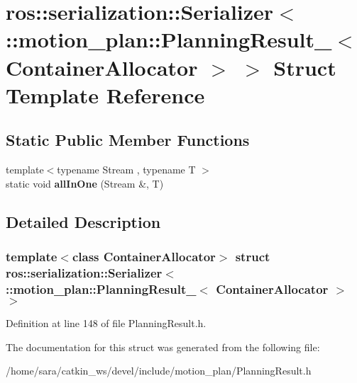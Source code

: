 \hypertarget{structros_1_1serialization_1_1Serializer_3_01_1_1motion__plan_1_1PlanningResult___3_01ContainerAllocator_01_4_01_4}{}\section{ros\+:\+:serialization\+:\+:Serializer$<$ \+:\+:motion\+\_\+plan\+:\+:Planning\+Result\+\_\+$<$ Container\+Allocator $>$ $>$ Struct Template Reference}
\label{structros_1_1serialization_1_1Serializer_3_01_1_1motion__plan_1_1PlanningResult___3_01ContainerAllocator_01_4_01_4}
\subsection*{Static Public Member Functions}
\begin{DoxyCompactItemize}
\item 
\mbox{\label{structros_1_1serialization_1_1Serializer_3_01_1_1motion__plan_1_1PlanningResult___3_01ContainerAllocator_01_4_01_4_aa1f6e021d099a9796adef3cd18d9aa7b}} 
{\footnotesize template$<$typename Stream , typename T $>$ }\\static void {\bfseries all\+In\+One} (Stream \&, T)
\end{DoxyCompactItemize}


\subsection{Detailed Description}
\subsubsection*{template$<$class Container\+Allocator$>$\newline
struct ros\+::serialization\+::\+Serializer$<$ \+::motion\+\_\+plan\+::\+Planning\+Result\+\_\+$<$ Container\+Allocator $>$ $>$}



Definition at line 148 of file Planning\+Result.\+h.



The documentation for this struct was generated from the following file\+:\begin{DoxyCompactItemize}
\item 
/home/sara/catkin\+\_\+ws/devel/include/motion\+\_\+plan/Planning\+Result.\+h\end{DoxyCompactItemize}
